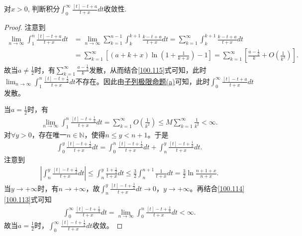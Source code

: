 \documentclass[../../main.tex]{subfiles}
\begin{document}
\begin{example}
对$x > 0$, 判断积分$\int_0^{\infty} \frac{[t] - t + a}{t + x} dt$收敛性.
\end{example}
\begin{proof}
注意到
\begin{align}
\lim_{n\to\infty}\int_1^n\frac{[t] - t + a}{t + x}dt &= \lim_{n\to\infty}\sum_{k=1}^{n-1}\int_k^{k+1}\frac{k - t + a}{t + x}dt = \sum_{k=1}^{\infty}\int_k^{k+1}\frac{k - t + a}{t + x}dt\nonumber\\
&= \sum_{k=1}^{\infty}\left[(a + k + x)\ln\left(1 + \frac{1}{k + x}\right) - 1\right] = \sum_{k=1}^{\infty}\left[\frac{a - \frac{1}{2}}{k} + O\left(\frac{1}{k^2}\right)\right].\label{100.115}
\end{align}
故当$a \ne \frac{1}{2}$时，有$\sum_{k=1}^{\infty}\frac{a - \frac{1}{2}}{k}$发散，从而结合\eqref{100.115}式可知，此时$\lim_{n\to\infty}\int_1^n\frac{[t] - t + \frac{1}{2}}{t + x}dt$不存在。因此由\hyperref[proposition:子列极限命题]{子列极限命题(a)}可知，此时$\int_0^{\infty}\frac{[t] - t + a}{t + x}dt$发散。

当$a = \frac{1}{2}$时，有
\begin{align}
\lim_{n\to\infty}\int_1^n\frac{[t] - t + \frac{1}{2}}{t + x}dt = \sum_{k=1}^{\infty}O\left(\frac{1}{k^2}\right) \leqslant M\sum_{k=1}^{\infty}\frac{1}{k^2} < \infty.\label{100.114}
\end{align}
对$\forall y > 0$，存在唯一$n \in \mathbb{N}$，使得$n \leqslant y < n + 1$。于是
\begin{align}
\int_0^y\frac{[t] - t + \frac{1}{2}}{t + x}dt = \int_0^n\frac{[t] - t + \frac{1}{2}}{t + x}dt + \int_n^y\frac{[t] - t + \frac{1}{2}}{t + x}dt.\label{100.113}
\end{align}
注意到
\begin{align*}
\left|\int_n^y\frac{[t] - t + \frac{1}{2}}{t + x}dt\right| \leqslant \int_n^y\frac{1 + \frac{1}{2}}{t + x}dt \leqslant \frac{3}{2}\int_n^{n+1}\frac{1}{t + x}dt = \frac{3}{2}\ln\frac{n + 1 + x}{n + x}.
\end{align*}
当$y \to +\infty$时，有$n \to +\infty$，故$\int_n^y\frac{[t] - t + \frac{1}{2}}{t + x}dt \to 0$，$y \to +\infty$。再结合\eqref{100.114}\eqref{100.113}式可知
\begin{align*}
\int_0^{\infty}\frac{[t] - t + \frac{1}{2}}{t + x}dt = \lim_{n\to\infty}\int_0^n\frac{[t] - t + \frac{1}{2}}{t + x}dt < \infty.
\end{align*}
故当$a = \frac{1}{2}$时，$\int_0^{\infty}\frac{[t] - t + \frac{1}{2}}{t + x}dt$收敛。
\end{proof}
\end{document}

